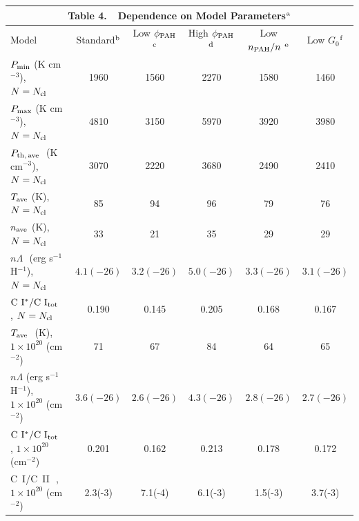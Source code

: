 \documentclass[12pt,preprint,flushrt]{aastex}
\newcommand{\pthave}{P_{\rm th,\,ave}}
\begin{document}
{\small
{}
\noindent
\begin{tabular}{lccccc}
\multicolumn{6}{c}{Table 4.\ \ Dependence on Model Parameters$^{\rm {a}}$
              \label{tbl:depmodelparam}} \\ \hline
{Model} & {Standard}$^{\rm b}$ & 
Low $\phi_{\rm PAH}$ $^{\rm c}$ &
High $\phi_{\rm PAH}$ $^{\rm d}$ & 
Low $n_{\rm PAH}/n$ $^{\rm e}$ &
Low $G_0$$^{\rm f}$ \\ \hline \hline
$P_{\rm min}$ (K cm$^{-3}$), $N=N_{\rm cl}$\tablenotemark{g} & 
           1960 & 1560 & 2270 & 1580 & 1460\\
$P_{\rm max}$ (K cm$^{-3}$), $N=N_{\rm cl}$\tablenotemark{g} & 
           4810 & 3150 & 5970 & 3920 & 3980\\
$\pthave$\tablenotemark{h}\,\,  (K cm$^{-3}$), 
           $N=N_{\rm cl}$\tablenotemark{g} & 
           3070 & 2220 & 3680 & 2490 & 2410\\
$T_{\rm ave}$\tablenotemark{i} (K), $N=N_{\rm cl}$\tablenotemark{g} & 
            85 & 94 & 96 & 79 & 76 \\
$n_{\rm ave}$\tablenotemark{j} (K), $N=N_{\rm cl}$\tablenotemark{g} & 
             33 & 21 & 35 & 29 & 29 \\
$n\Lambda$\tablenotemark{k}\,\, (erg s$^{-1}$ H$^{-1}$),
      $N=N_{\rm cl}$\tablenotemark{g} & $4.1(-26)$  & $3.2(-26)$ &
       $5.0(-26)$ & $3.3(-26)$ & $3.1(-26)$ \\
${\rm C~I^*/C~I_{\rm tot}}$\tablenotemark{l}\,\, ,
      $N=N_{\rm cl}$\tablenotemark{g} & 0.190 & 0.145 &
       0.205 & 0.168 & 0.167 \\
$T_{\rm ave}$\tablenotemark{i}\,\, (K), 
         $1\times 10^{20}$ (cm$^{-2}$)\tablenotemark{m}&
                        71 & 67 & 84 & 64 & 65 \\
$n\Lambda$\tablenotemark{k} (erg s$^{-1}$ H$^{-1}$),
      $1\times 10^{20}$ (cm$^{-2}$)\tablenotemark{m} & 
       $3.6(-26)$  & $2.6(-26)$ &
       $4.3(-26)$ & $2.8(-26)$ & $2.7(-26)$ \\
${\rm C~I^*/C~I_{\rm tot}}$\tablenotemark{l}\,\, ,
      $1\times 10^{20}$ (cm$^{-2}$)\tablenotemark{m} & 0.201 & 0.162 &
       0.213 & 0.178 & 0.172 \\ 
C~I/C~II\tablenotemark{n}\,\, , 
          $1\times 10^{20}$ (cm$^{-2}$)\tablenotemark{m} &
          2.3(-3) & 7.1(-4) & 6.1(-3) & 1.5(-3) & 3.7(-3) \\ \hline
\end{tabular}

}
\end{document}
